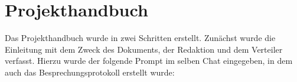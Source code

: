 
\section{Projekthandbuch}  \label{CompProjekthandbuch}

Das Projekthandbuch wurde in zwei Schritten erstellt. Zunächst wurde die Einleitung mit dem Zweck des Dokuments, der Redaktion 
und dem Verteiler verfasst. Hierzu wurde der folgende Prompt im selben Chat eingegeben, in dem auch das Besprechungsprotokoll 
erstellt wurde:

